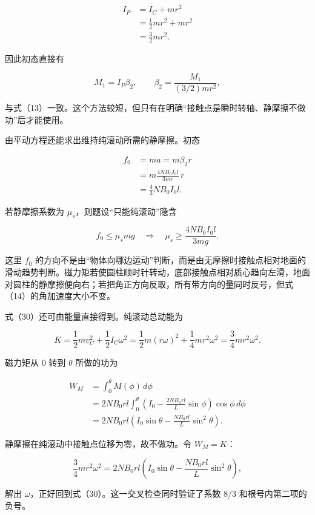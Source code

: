 \documentclass[12pt,a4paper,UTF8]{ctexart}
\begin{document}
\[
\begin{aligned}
I_P
&=I_C+mr^2\\
&=\frac12mr^2+mr^2\\
&=\frac32mr^2. 
\end{aligned} \tag{32}
\]

因此初态直接有

\[
M_1=I_P\beta_2,
\qquad
\beta_2=\frac{M_1}{(3/2)mr^2}, \tag{33}
\]

与式（13）一致。这个方法较短，但只有在明确``接触点是瞬时转轴、静摩擦不做功''后才能使用。

由平动方程还能求出维持纯滚动所需的静摩擦。初态

\[
\begin{aligned}
f_0
&=ma=m\beta_2r\\
&=m\frac{4NB_0I_0l}{3mr}\,r\\
&=\frac43NB_0I_0l.
\end{aligned} \tag{34}
\]

若静摩擦系数为 \(\mu_s\)，则题设``只能纯滚动''隐含

\[
f_0\leqslant\mu_smg
\quad\Longrightarrow\quad
\mu_s\geqslant\frac{4NB_0I_0l}{3mg}. \tag{35}
\]

这里 \(f_0\)
的方向不是由``物体向哪边运动''判断，而是由无摩擦时接触点相对地面的滑动趋势判断。磁力矩若使圆柱顺时针转动，底部接触点相对质心趋向左滑，地面对圆柱的静摩擦便向右；若把角正方向反取，所有带方向的量同时反号，但式（14）的角加速度大小不变。

式（30）还可由能量直接得到。纯滚动总动能为

\[
K=\frac12mv_C^2+\frac12I_C\omega^2
=\frac12m(r\omega)^2+\frac14mr^2\omega^2
=\frac34mr^2\omega^2. \tag{36}
\]

磁力矩从 \(0\) 转到 \(\theta\) 所做的功为

\[
\begin{aligned}
W_M
&=\int_0^\theta M(\phi)\,d\phi\\
&=2NB_0rl\int_0^\theta
\left(I_0-\frac{2NB_0rl}{L}\sin\phi\right)
\cos\phi\,d\phi\\
&=2NB_0rl
\left(I_0\sin\theta-\frac{NB_0rl}{L}\sin^2\theta\right).
\end{aligned} \tag{37}
\]

静摩擦在纯滚动中接触点位移为零，故不做功。令 \(W_M=K\)：

\[
\frac34mr^2\omega^2
=2NB_0rl
\left(I_0\sin\theta-\frac{NB_0rl}{L}\sin^2\theta\right), \tag{38}
\]

解出 \(\omega\)，正好回到式（30）。这一交叉检查同时验证了系数 \(8/3\)
和根号内第二项的负号。
\end{document}
